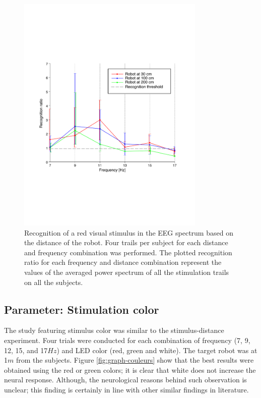 \documentclass{svmult}
\begin{document}
\begin{figure}
\center
\includegraphics[width=0.8\textwidth]{figures/graph-distances.pdf}
\caption{Recognition of a red visual stimulus in the EEG spectrum based on the distance of the robot. Four trails per subject for each distance and frequency combination was performed. The plotted recognition ratio for each frequency and distance combination represent the values of the averaged power spectrum of all the stimulation trails on all the subjects.}
\label{fig:graph-distances}
\end{figure}

\subsection{Parameter: Stimulation color}
The study featuring stimulus color was similar to the stimulus-distance experiment. Four trials were conducted for each combination of frequency (7, 9, 12, 15, and 17$Hz$) and LED color (red, green and white). The target robot was at 1$m$ from the subjects. Figure \ref{fig:graph-couleurs} show that the best results were obtained using the red or green colors; it is clear that white does not increase the neural response. Although, the neurological reasons behind such observation is unclear; this finding is certainly in line with other similar findings in literature.
\end{document}

